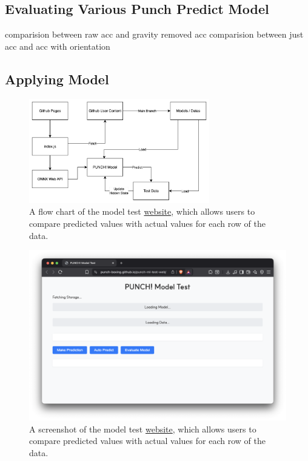 \documentclass{article}
\begin{document}
\FloatBarrier
\subsection{Evaluating Various Punch Predict Model}
comparision between raw acc and gravity removed acc
comparision between just acc and acc with orientation


\FloatBarrier
\subsection{Applying Model}


\FloatBarrier
\begin{figure}[h]
    \centering
    \includegraphics[width=0.7\textwidth]{model_test_web_flow_chart.png}
    \caption{A flow chart of the model test \href{https://punch-boxing.github.io/punch-ml-test-web/}{website}, which allows users to compare predicted values with actual values for each row of the data.}
    \label{fig:model_test_web_flow_chart}
\end{figure}

\FloatBarrier
\begin{figure}[h]
    \centering
    \includegraphics[width=\textwidth]{model_test_web.png}
    \caption{A screenshot of the model test \href{https://punch-boxing.github.io/punch-ml-test-web/}{website}, which allows users to compare predicted values with actual values for each row of the data.}
    \label{fig:model_test_web}
\end{figure}
\end{document}
